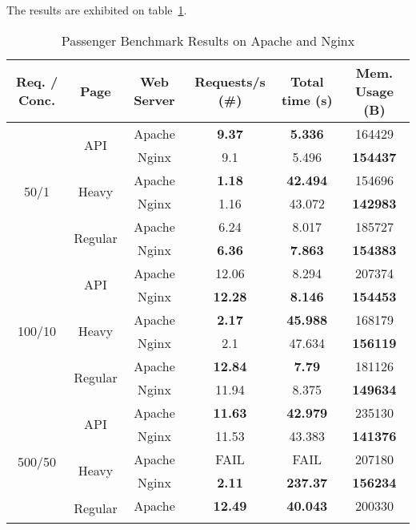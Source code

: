 The results are exhibited on table~\ref{tab:passenger_benchmark}.
\begin{table}[h!t]
  \centering
  \caption{Passenger Benchmark Results on Apache and Nginx}
  \label{tab:passenger_benchmark}
  
  \begin{tabular}{c|c|c|c|c|c}

    \textbf{Req. / Conc.} & \textbf{Page} & \textbf{Web Server} & \textbf{Requests/s (\#)} & \textbf{Total time (s)} & \textbf{Mem. Usage (B)} \\ \hline
    \multirow{6}{*}{50/1} & \multirow{2}{*}{API} & Apache & \textbf{9.37} & \textbf{5.336} & 164429\\\cline{3-6}
     &  & Nginx & 9.1 & 5.496 & \textbf{154437}\\\cline{2-6}
     & \multirow{2}{*}{Heavy} & Apache & \textbf{1.18} & \textbf{42.494} & 154696\\\cline{3-6}
     &  & Nginx & 1.16 & 43.072 & \textbf{142983}\\\cline{2-6}
     & \multirow{2}{*}{Regular} & Apache & 6.24 & 8.017 & 185727\\\cline{3-6}
     &  & Nginx & \textbf{6.36} & \textbf{7.863} & \textbf{154383}\\\hline
    \multirow{6}{*}{100/10} & \multirow{2}{*}{API} & Apache & 12.06 & 8.294 & 207374\\\cline{3-6}
     &  & Nginx & \textbf{12.28} & \textbf{8.146} & \textbf{154453}\\\cline{2-6}
     & \multirow{2}{*}{Heavy} & Apache & \textbf{2.17} & \textbf{45.988} & 168179\\\cline{3-6}
     &  & Nginx & 2.1 & 47.634 & \textbf{156119}\\\cline{2-6}
     & \multirow{2}{*}{Regular} & Apache & \textbf{12.84} & \textbf{7.79} & 181126\\\cline{3-6}
     &  & Nginx & 11.94 & 8.375 & \textbf{149634}\\\hline
    \multirow{6}{*}{500/50} & \multirow{2}{*}{API} & Apache & \textbf{11.63} & \textbf{42.979} & 235130\\\cline{3-6}
     &  & Nginx & 11.53 & 43.383 & \textbf{141376}\\\cline{2-6}
     & \multirow{2}{*}{Heavy} & Apache & FAIL & FAIL & 207180\\\cline{3-6}
     &  & Nginx & \textbf{2.11} & \textbf{237.37} & \textbf{156234}\\\cline{2-6}
     & \multirow{2}{*}{Regular} & Apache & \textbf{12.49} & \textbf{40.043} & 200330\\\cline{3-6}

\end{tabular}
\end{table}
